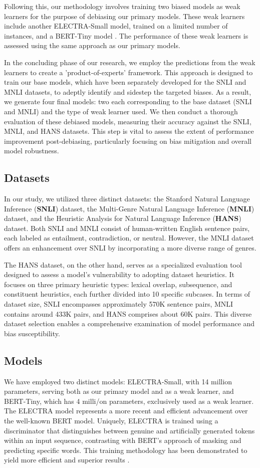 \documentclass[11pt,a4paper]{article}
\begin{document}
Following this, our methodology involves training two biased models as weak learners for the purpose of debiasing our primary models. These weak learners include another ELECTRA-Small model, trained on a limited number of instances, and a BERT-Tiny model \cite{turc2019wellread}. The performance of these weak learners is assessed using the same approach as our primary models.

In the concluding phase of our research, we employ the predictions from the weak learners to create a 'product-of-experts' framework. This approach is designed to train our base models, which have been separately developed for the SNLI and MNLI datasets, to adeptly identify and sidestep the targeted biases. As a result, we generate four final models: two each corresponding to the base dataset (SNLI and MNLI) and the type of weak learner used. We then conduct a thorough evaluation of these debiased models, measuring their accuracy against the SNLI, MNLI, and HANS datasets. This step is vital to assess the extent of performance improvement post-debiasing, particularly focusing on bias mitigation and overall model robustness.

\subsection{Datasets}
In our study, we utilized three distinct datasets: the Stanford Natural Language Inference (\textbf{SNLI}) dataset, the Multi-Genre Natural Language Inference (\textbf{MNLI}) dataset, and the Heuristic Analysis for Natural Language Inference (\textbf{HANS}) dataset. Both SNLI and MNLI consist of human-written English sentence pairs, each labeled as entailment, contradiction, or neutral. However, the MNLI dataset offers an enhancement over SNLI by incorporating a more diverse range of genres.

The HANS dataset, on the other hand, serves as a specialized evaluation tool designed to assess a model's vulnerability to adopting dataset heuristics. It focuses on three primary heuristic types: lexical overlap, subsequence, and constituent heuristics, each further divided into 10 specific subcases. In terms of dataset size, SNLI encompasses approximately 570K sentence pairs, MNLI contains around 433K pairs, and HANS comprises about 60K pairs. This diverse dataset selection enables a comprehensive examination of model performance and bias susceptibility.


\subsection{Models}
We have employed two distinct models: ELECTRA-Small, with 14 million parameters, serving both as our primary model and as a weak learner, and BERT-Tiny, which has 4 milli/on parameters, exclusively used as a weak learner. The ELECTRA model represents a more recent and efficient advancement over the well-known BERT model. Uniquely, ELECTRA is trained using a discriminator that distinguishes between genuine and artificially generated tokens within an input sequence, contrasting with BERT's approach of masking and predicting specific words. This training methodology has been demonstrated to yield more efficient and superior results \cite{clark2019dont}.
\end{document}
